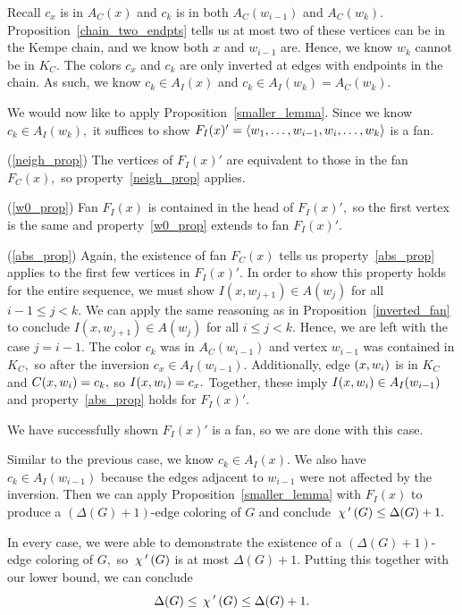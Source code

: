  Recall $c_x$ is in $A_C(x)$ and $c_k$ is in both $A_C(w_{i-1})$ and $A_C(w_k).$ Proposition~\ref{chain_two_endpts} tells us at most two of these vertices can be in the Kempe chain, and we know both $x$ and $w_{i-1}$ are. Hence, we know $w_{k}$ cannot be in $K_C.$ The colors $c_x$ and $c_k$ are only inverted at edges with endpoints in the chain. As such, we know $c_k \in A_I(x)$ and $c_k \in A_I(w_k) = A_C(w_k).$ 

We would now like to apply Proposition~\ref{smaller_lemma}. Since we know $c_k \in A_I(w_k),$ it suffices to show $F_I(x)' = \langle w_1, \dots, w_{i-1}, w_i, \dots, w_k \rangle$ is a fan.

(\ref{neigh_prop}) The vertices of $F_I(x)'$ are equivalent to those in the fan $F_C(x),$ so property~\ref{neigh_prop} applies.

(\ref{w0_prop}) Fan $F_I(x)$ is contained in the head of $F_I(x)',$ so the first vertex is the same and property~\ref{w0_prop} extends to fan $F_I(x)'.$

(\ref{abs_prop}) Again, the existence of fan $F_C(x)$ tells us property~\ref{abs_prop} applies to the first few vertices in $F_I(x)'.$ In order to show this property holds for the entire sequence, we must show $I(x, w_{j+1}) \in A(w_j)$ for all ${i-1} \leq j < k.$ We can apply the same reasoning as in Proposition~\ref{inverted_fan} to conclude $I(x, w_{j+1}) \in A(w_j)$ for all $i \leq j < k.$ Hence, we are left with the case $j = i - 1.$  The color $c_k$ was in $A_C(w_{i-1})$ and vertex $w_{i-1}$ was contained in $K_C,$ so after the inversion $c_x \in A_I(w_{i-1})$. Additionally, edge $(x, w_i)$ is in $K_C$ and $C(x, w_i) = c_k,$ so $I(x, w_i) = c_x.$ Together, these imply $I(x, w_i) \in A_I(w_{i-1})$ and property~\ref{abs_prop} holds for $F_I(x)'.$

We have successfully shown $F_I(x)'$ is a fan, so we are done with this case.

Similar to the previous case, we know $c_k \in A_I(x).$ We also have $c_k \in A_I(w_{i-1})$ because the edges adjacent to $w_{i-1}$ were not affected by the inversion. Then we can apply Proposition~\ref{smaller_lemma} with $F_I(x)$ to produce a $(\Delta(G) + 1)$-edge coloring of $G$ and conclude $\,\chi\,'\,(G) \leq \Delta(G) + 1.$

In every case, we were able to demonstrate the existence of a $(\Delta(G) + 1)$-edge coloring of $G,$ so $\,\chi\,'\,(G)$ is at most $\Delta(G) + 1.$ Putting this together with our lower bound, we can conclude $$\Delta(G) \leq \,\chi\,'\,(G) \leq \Delta(G) + 1.$$
